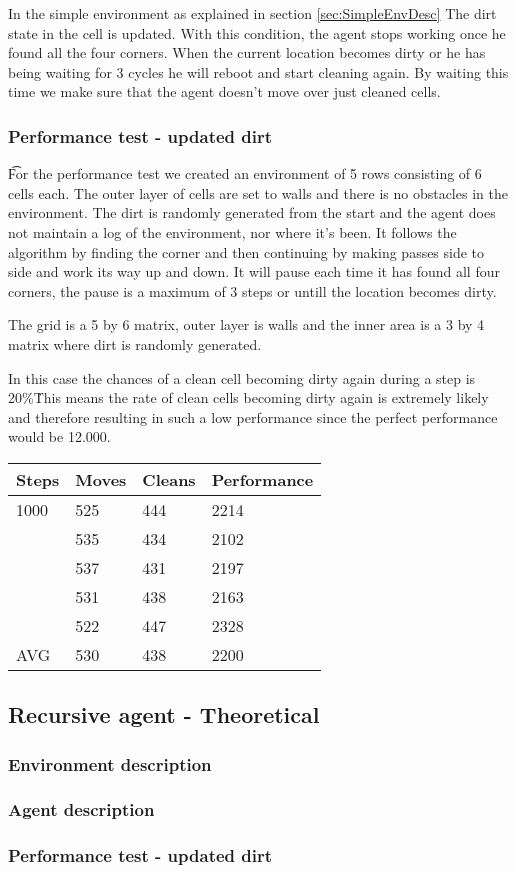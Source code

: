 In the simple environment as explained in section \ref{sec:SimpleEnvDesc} The dirt
 state in the cell is updated. With this condition, the agent stops working once he
 found all the four corners. When the current location becomes dirty or he has being
 waiting for 3 cycles he will reboot and start cleaning again. By waiting this time 
 we make sure that the agent doesn't move over just cleaned cells.

\subsubsection{Performance test - updated dirt}
\t For the performance test we created an environment of 5 rows consisting of 6
cells each.  The outer layer of cells are set to walls and there is no obstacles
in the environment.  The dirt is randomly generated from the start and the agent
does not maintain a log of the environment, nor where it's been. It follows the
algorithm by finding the corner and then continuing by making passes side to
side and work its way up and down.  It will pause each time it has found all
four corners, the pause is a maximum of 3 steps or untill the location becomes
dirty.

The grid is a 5 by 6 matrix, outer layer is walls and the inner area is a 3 by 4
matrix where dirt is randomly generated.

In this case the chances of a clean cell becoming dirty again during a step is
20\%\.  This means the rate of clean cells becoming dirty again is extremely
likely and therefore resulting in such a low performance since the perfect
performance would be 12.000.

\begin{longtable}{ p{} p{} p{} 
									 p{} }
Steps & Moves & Cleans	& Performance \\\hline
1000	& 525 & 444 & 2214 \\
 		 	& 535 & 434 & 2102 \\
 			& 537 & 431 & 2197 \\
 			& 531 & 438 & 2163 \\
 			& 522 & 447 & 2328 \\\hline
AVG		& 530 & 438 &	2200 \\\hline
\end{longtable}


\subsection{Recursive agent - Theoretical}
\subsubsection{Environment description}

\subsubsection{Agent description}

\subsubsection{Performance test - updated dirt}


